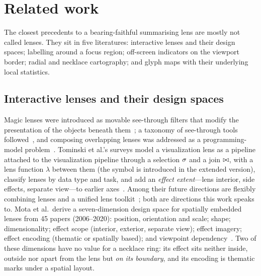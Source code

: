 \section{Related work}
\label{sec:related}

The closest precedents to a bearing-faithful summarising lens are mostly not
called lenses. They sit in five literatures: interactive lenses and their design
spaces; labelling around a focus region; off-screen indicators on the viewport
border; radial and necklace cartography; and glyph maps with their underlying
local statistics.

\subsection{Interactive lenses and their design spaces}

Magic lenses were introduced as movable see-through filters that modify the
presentation of the objects beneath them~\cite{bier1993toolglass}; a taxonomy of
see-through tools followed~\cite{bier1994taxonomy}, and composing overlapping
lenses was addressed as a programming-model problem~\cite{fox1998composing}.
Tominski et al.'s surveys model a visualization lens as a pipeline attached to
the visualization pipeline through a selection $\sigma$ and a join $\bowtie$, with a
lens function $\lambda$ between them (the symbol is introduced in the extended
version), classify lenses by data type and task, and add an \emph{effect
extent}---lens interior, side effects, separate view---to earlier
axes~\cite{tominski2014star,tominski2017survey}. Among their future directions
are flexibly combining lenses and a unified lens toolkit~\cite{tominski2014star,
tominski2017survey}; both are directions this work speaks to. Mota et al.\ derive
a seven-dimension design space for spatially embedded lenses from 45 papers
(2006--2020): position, orientation and scale; shape; dimensionality; effect
scope (interior, exterior, separate view); effect imagery; effect encoding
(thematic or spatially based); and viewpoint dependency~\cite{mota2025design}.
Two of these dimensions have no value for a necklace ring: its effect sits
neither inside, outside nor apart from the lens but \emph{on its boundary},
and its encoding is thematic marks under a spatial layout.

